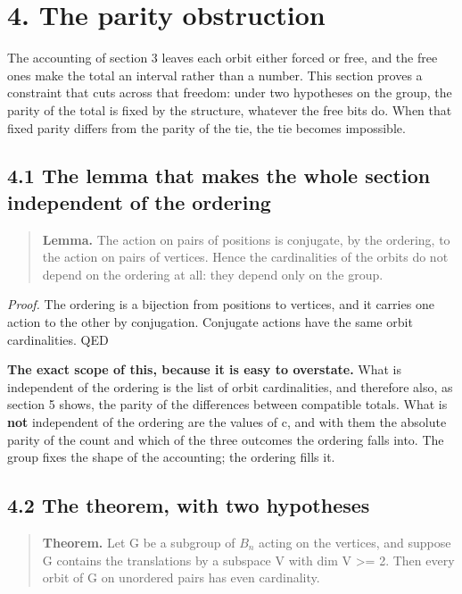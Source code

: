 \documentclass[11pt,a4paper]{article}
\begin{document}
\section*{4. The parity obstruction}

The accounting of section 3 leaves each orbit either forced or free, and the free ones make the total an interval rather than a number. This section proves a constraint that cuts across that freedom: under two hypotheses on the group, the parity of the total is fixed by the structure, whatever the free bits do. When that fixed parity differs from the parity of the tie, the tie becomes impossible.

\subsection*{4.1 The lemma that makes the whole section independent of the ordering}

\begin{quote}
\textbf{Lemma.} The action on pairs of positions is conjugate, by the ordering, to the action on pairs of vertices. Hence the cardinalities of the orbits do not depend on the ordering at all: they depend only on the group.
\end{quote}

\emph{Proof.} The ordering is a bijection from positions to vertices, and it carries one action to the other by conjugation. Conjugate actions have the same orbit cardinalities. QED

\textbf{The exact scope of this, because it is easy to overstate.} What is independent of the ordering is the list of orbit cardinalities, and therefore also, as section 5 shows, the parity of the differences between compatible totals. What is \textbf{not} independent of the ordering are the values of c, and with them the absolute parity of the count and which of the three outcomes the ordering falls into. The group fixes the shape of the accounting; the ordering fills it.

\subsection*{4.2 The theorem, with two hypotheses}

\begin{quote}
\textbf{Theorem.} Let G be a subgroup of $B_n$ acting on the vertices, and suppose G contains the translations by a subspace V with dim V >= 2. Then every orbit of G on unordered pairs has even cardinality.
\end{quote}
\end{document}
